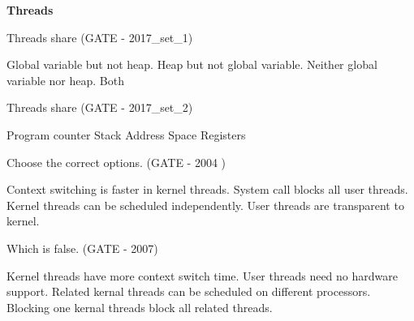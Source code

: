 \centerline{\textbf{ \LARGE Threads}}



\begin{questyle}

  \question  Threads share (GATE - 2017\_set\_1)

  \begin{choices}
    \choice Global variable but not heap.
    \choice Heap but not global variable.
    \choice Neither global variable nor heap.
    \choice Both
  \end{choices}


  \end{questyle}





\begin{questyle}

  \question  Threads share (GATE - 2017\_set\_2)
    \begin{choices}
      \choice Program counter
      \choice Stack
      \choice Address Space
      \choice Registers
    \end{choices}


  \end{questyle}





\begin{questyle}

  \question Choose the correct options. (GATE - 2004 )

  \begin{choices}
    \choice Context switching is faster in kernel threads.
    \choice System call blocks all user threads.
    \choice Kernel threads can be scheduled independently.
    \choice User threads are transparent to kernel.
  \end{choices}


  \end{questyle}





\begin{questyle}

  \question Which is false. (GATE -  2007)

  \begin{choices}
    \choice Kernel threads have more context switch time.
    \choice User threads need no hardware support.
    \choice Related kernal threads can be scheduled on different processors.
    \choice Blocking one kernal threads block all related threads.
  \end{choices}


  \end{questyle}



